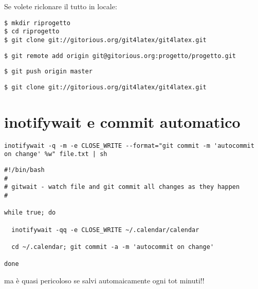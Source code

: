 \documentclass[a4paper,12pt,oneside]{article}
\begin{document}
Se volete riclonare il tutto in locale:
\begin{lstlisting}
$ mkdir riprogetto
$ cd riprogetto
$ git clone git://gitorious.org/git4latex/git4latex.git
\end{lstlisting}

\begin{lstlisting}
$ git remote add origin git@gitorious.org:progetto/progetto.git
\end{lstlisting}

\begin{lstlisting}
$ git push origin master
\end{lstlisting}

\begin{lstlisting}
$ git clone git://gitorious.org/git4latex/git4latex.git
\end{lstlisting}

\section{inotifywait e commit automatico}

\begin{lstlisting}
inotifywait -q -m -e CLOSE_WRITE --format="git commit -m 'autocommit on change' %w" file.txt | sh
\end{lstlisting}

\begin{lstlisting}
#!/bin/bash
#
# gitwait - watch file and git commit all changes as they happen
#

while true; do

  inotifywait -qq -e CLOSE_WRITE ~/.calendar/calendar

  cd ~/.calendar; git commit -a -m 'autocommit on change'

done
\end{lstlisting}

ma è quasi pericoloso se salvi automaicamente ogni tot minuti!!
\end{document}
